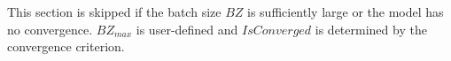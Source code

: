 This section is skipped if the batch size $BZ$ is sufficiently large or the model has no convergence. $BZ_{max}$ is user-defined and $IsConverged$ is determined by the convergence criterion.
 


